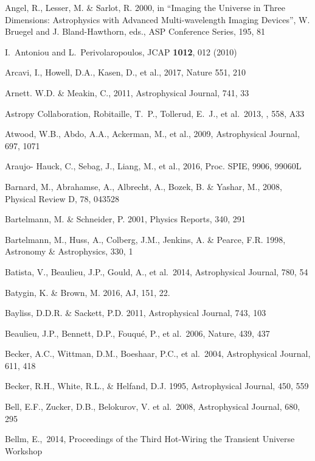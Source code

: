 \documentclass[twocolumn]{aastex61}
\begin{document}
\begin{thebibliography}{}
\bibitem[()]{} Angel, R., Lesser, M. \& Sarlot, R. 2000, in  ``Imaging the Universe in Three
             Dimensions: Astrophysics with Advanced Multi-wavelength Imaging Devices'',
             W. Bruegel and J. Bland-Hawthorn, eds., ASP Conference Series, 195, 81

\bibitem[()]{} I.~Antoniou and L.~Perivolaropoulos, JCAP {\bf 1012}, 012 (2010)

\bibitem[()]{} Arcavi, I., Howell, D.A., Kasen, D., et al., 2017, Nature 551, 210

\bibitem[()]{} Arnett. W.D. \& Meakin, C., 2011, Astrophysical Journal, 741, 33

 Astropy Collaboration, Robitaille, T.~P., Tollerud, E.~J., et al.\ 2013, \aap, 558, A33

\bibitem[()]{} Atwood, W.B., Abdo, A.A., Ackerman, M., et al., 2009, Astrophysical Journal, 697, 1071

 Araujo- Hauck, C., Sebag, J., Liang, M., et al., 2016,  Proc. SPIE, 9906, 99060L

\bibitem[()]{} Barnard, M., Abrahamse, A., Albrecht, A., Bozek, B. \& Yashar, M., 2008, Physical Review D, 78, 043528

\bibitem[()]{} Bartelmann, M. \& Schneider, P. 2001, Physics Reports, 340, 291

\bibitem[()]{} Bartelmann, M., Huss, A., Colberg, J.M., Jenkins, A. \& Pearce, F.R. 1998, Astronomy \&
             Astrophysics, 330, 1

\bibitem[()]{} Batista, V., Beaulieu, J.P., Gould, A., et al.~2014, Astrophysical Journal, 780, 54

\bibitem[()]{} Batygin, K. \& Brown, M. 2016, AJ, 151, 22.

\bibitem[()]{} Bayliss, D.D.R. \& Sackett, P.D. 2011, Astrophysical Journal, 743, 103

\bibitem[()]{} Beaulieu, J.P., Bennett, D.P., Fouqu\'{e}, P., et al.~2006, Nature, 439, 437

\bibitem[()]{} Becker, A.C., Wittman, D.M., Boeshaar, P.C., et al.~2004, Astrophysical Journal, 611, 418

\bibitem[()]{} Becker, R.H., White, R.L., \& Helfand, D.J. 1995, Astrophysical Journal, 450, 559

\bibitem[()]{} Bell, E.F., Zucker, D.B., Belokurov, V. et al.~2008, Astrophysical Journal, 680, 295

\bibitem[()]{} Bellm, E.,~2014, Proceedings of the Third Hot-Wiring the Transient Universe Workshop


\end{thebibliography}
\end{document}
